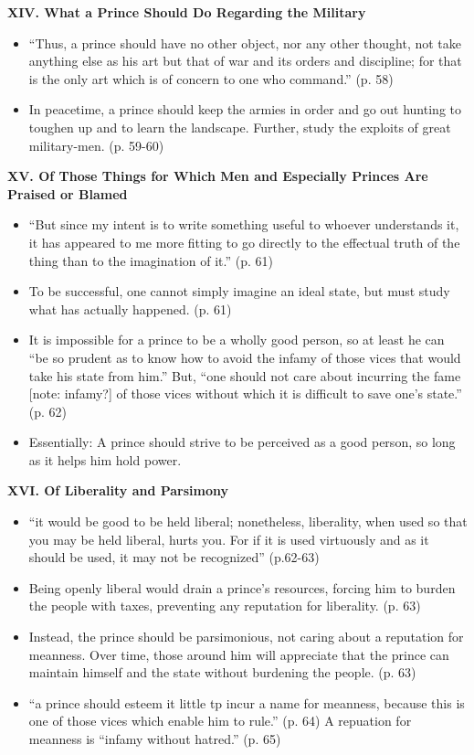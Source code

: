 \documentclass[10pt]{article}
\newcommand{\keyquote}[1]{{\color{BrickRed}#1}}
\begin{document}
\textbf{XIV. What a Prince Should Do Regarding the Military}
\begin{itemize}
\item
    \keyquote{
    ``Thus, a prince should have no other object, nor any other thought, not 
    take anything else as his art but that of war and its orders and
    discipline; for that is the only art which is of concern to
    one who command.''} (p. 58)
\item
    In peacetime, a prince should keep the armies in order and go out
    hunting to toughen up and to learn the landscape. Further,
    study the exploits of great military-men. (p. 59-60)
\end{itemize}

\textbf{XV. Of Those Things for Which Men and Especially Princes
Are Praised or Blamed}
\begin{itemize}
\item
    \keyquote{
    ``But since my intent is to write something useful to whoever 
    understands it, it has appeared to me more fitting to go
    directly to the effectual truth of the thing than to the 
    imagination of it.''} (p. 61)
\item    
    To be successful, one cannot simply imagine an ideal state, 
    but must study what has actually happened. (p. 61)
\item
    It is impossible for a prince to be a wholly good person,
    so at least he can ``be so prudent as to know how to avoid
    the infamy of those vices that would take his state from him.'' 
    But, ``one should not care about incurring
    the fame [note: infamy?] of those vices without which
    it is difficult to save one's state.'' (p. 62)
\item 
    Essentially: A prince should strive to be perceived as a good person, 
    so long as it helps him hold power. 
\end{itemize}

\textbf{XVI. Of Liberality and Parsimony}
\begin{itemize}
\item   
    ``it would be good to be held liberal; nonetheless, liberality,
    when used so that you may be held liberal, hurts you. For if it 
    is used virtuously and as it should be used, it may not be 
    recognized'' (p.62-63)
\item 
    Being openly liberal would drain a prince's resources, forcing
    him to burden the people with taxes, preventing any reputation
    for liberality. (p. 63)
\item
    Instead, the prince should be parsimonious, not caring about a 
    reputation for meanness. Over time, those around him will 
    appreciate that the prince can maintain himself and the state
    without burdening the people. (p. 63)
\item
    ``a prince should esteem it little tp incur a name for meanness,
    because this is one of those vices which enable him to rule.''
    (p. 64) 
    A repuation for meanness is ``infamy without hatred.''
    (p. 65)
\end{itemize}
\end{document}
